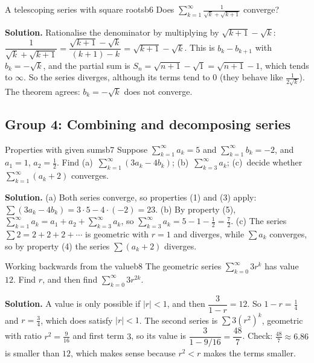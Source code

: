 \documentclass[11pt]{article}
\begin{document}
\begin{exmp}{A telescoping series with square roots}{b6}
Does $\displaystyle\sum_{k=1}^\infty\frac1{\sqrt k+\sqrt{k+1}}$ converge?

\textbf{Solution.} Rationalise the denominator by multiplying by $\sqrt{k+1}-\sqrt k$: $\dfrac1{\sqrt k+\sqrt{k+1}}=\dfrac{\sqrt{k+1}-\sqrt k}{(k+1)-k}=\sqrt{k+1}-\sqrt k$. This is $b_k-b_{k+1}$ with $b_k=-\sqrt k$, and the partial sum is $S_n=\sqrt{n+1}-\sqrt1=\sqrt{n+1}-1$, which tends to $\infty$. So the series diverges, although its terms tend to $0$ (they behave like $\frac1{2\sqrt k}$). The theorem agrees: $b_k=-\sqrt k$ does not converge.
\end{exmp}

\subsection*{Group 4: Combining and decomposing series}

\begin{exmp}{Properties with given sums}{b7}
Suppose $\sum_{k=1}^\infty a_k=5$ and $\sum_{k=1}^\infty b_k=-2$, and $a_1=1$, $a_2=\frac12$. Find (a)~$\sum_{k=1}^\infty(3a_k-4b_k)$; (b)~$\sum_{k=3}^\infty a_k$; (c)~decide whether $\sum_{k=1}^\infty(a_k+2)$ converges.

\textbf{Solution.} (a) Both series converge, so properties (1) and (3) apply: $\sum(3a_k-4b_k)=3\cdot5-4\cdot(-2)=23$. (b) By property (5), $\sum_{k=1}^\infty a_k=a_1+a_2+\sum_{k=3}^\infty a_k$, so $\sum_{k=3}^\infty a_k=5-1-\frac12=\frac72$. (c) The series $\sum2=2+2+2+\cdots$ is geometric with $r=1$ and diverges, while $\sum a_k$ converges, so by property (4) the series $\sum(a_k+2)$ diverges.
\end{exmp}

\begin{exmp}{Working backwards from the value}{b8}
The geometric series $\sum_{k=0}^\infty3r^k$ has value $12$. Find $r$, and then find $\sum_{k=0}^\infty3r^{2k}$.

\textbf{Solution.} A value is only possible if $|r|<1$, and then $\dfrac3{1-r}=12$. So $1-r=\frac14$ and $r=\frac34$, which does satisfy $|r|<1$. The second series is $\sum3\left(r^2\right)^k$, geometric with ratio $r^2=\frac9{16}$ and first term $3$, so its value is $\dfrac3{1-9/16}=\dfrac{48}7$. Check: $\frac{48}7\approx6.86$ is smaller than $12$, which makes sense because $r^2<r$ makes the terms smaller.
\end{exmp}
\end{document}

